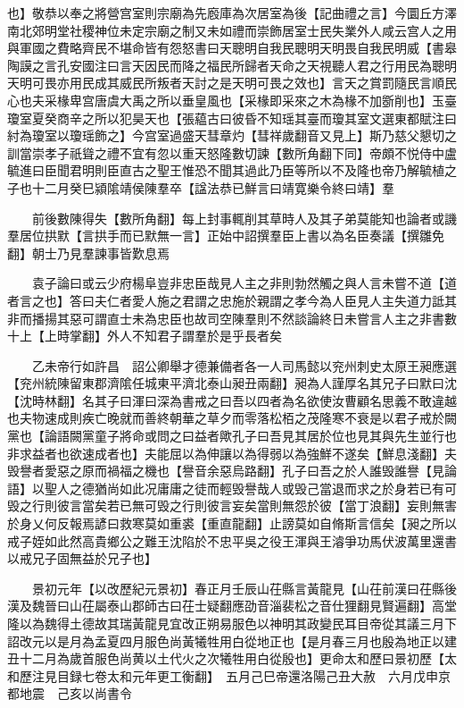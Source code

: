 也】敬恭以奉之將營宫室則宗廟為先廏庫為次居室為後【記曲禮之言】今圜丘方澤南北郊明堂社稷神位未定宗廟之制又未如禮而崇飾居室士民失業外人咸云宫人之用與軍國之費略齊民不堪命皆有怨怒書曰天聰明自我民聰明天明畏自我民明威【書皋陶謨之言孔安國注曰言天因民而降之福民所歸者天命之天視聽人君之行用民為聰明天明可畏亦用民成其威民所叛者天討之是天明可畏之效也】言天之賞罰隨民言順民心也夫采椽卑宫唐虞大禹之所以垂皇風也【采椽即采來之木為椽不加斵削也】玉臺瓊室夏癸商辛之所以犯昊天也【張藴古曰彼昏不知瑶其臺而瓊其室文選東都賦注曰紂為瓊室以瓊瑶飾之】今宫室過盛天彗章灼【彗祥歲翻音又見上】斯乃慈父懇切之訓當崇孝子祇聳之禮不宜有忽以重天怒隆數切諫【數所角翻下同】帝頗不悦侍中盧毓進曰臣聞君明則臣直古之聖王惟恐不聞其過此乃臣等所以不及隆也帝乃解毓植之子也十二月癸巳潁隂靖侯陳羣卒【諡法恭已鮮言曰靖寛樂令終曰靖】羣

　　前後數陳得失【數所角翻】每上封事輒削其草時人及其子弟莫能知也論者或譏羣居位拱默【言拱手而已默無一言】正始中詔撰羣臣上書以為名臣奏議【撰雛免翻】朝士乃見羣諫事皆歎息焉

　　袁子論曰或云少府楊阜豈非忠臣哉見人主之非則勃然觸之與人言未嘗不道【道者言之也】答曰夫仁者愛人施之君謂之忠施於親謂之孝今為人臣見人主失道力詆其非而播揚其惡可謂直士未為忠臣也故司空陳羣則不然談論終日未嘗言人主之非書數十上【上時掌翻】外人不知君子謂羣於是乎長者矣

　　乙未帝行如許昌　詔公卿舉才德兼備者各一人司馬懿以兖州刺史太原王昶應選【兖州統陳留東郡濟隂任城東平濟北泰山昶丑兩翻】昶為人謹厚名其兄子曰默曰沈【沈時林翻】名其子曰渾曰深為書戒之曰吾以四者為名欲使汝曹顧名思義不敢違越也夫物速成則疾亡晚就而善終朝華之草夕而零落松栢之茂隆寒不衰是以君子戒於闕黨也【論語闕黨童子將命或問之曰益者歟孔子曰吾見其居於位也見其與先生並行也非求益者也欲速成者也】夫能屈以為伸讓以為得弱以為強鮮不遂矣【鮮息淺翻】夫毁譽者愛惡之原而禍福之機也【譽音余惡烏路翻】孔子曰吾之於人誰毁誰譽【見論語】以聖人之德猶尚如此况庸庸之徒而輕毁譽哉人或毁己當退而求之於身若已有可毁之行則彼言當矣若已無可毁之行則彼言妄矣當則無怨於彼【當丁浪翻】妄則無害於身乂何反報焉諺曰救寒莫如重裘【重直龍翻】止謗莫如自脩斯言信矣【昶之所以戒子姪如此然高貴鄉公之難王沈陷於不忠平吳之役王渾與王濬爭功馬伏波萬里還書以戒兄子固無益於兄子也】

　　景初元年【以改歷紀元景初】春正月壬辰山茌縣言黃龍見【山茌前漢曰茌縣後漢及魏晉曰山茌屬泰山郡師古曰茌士疑翻應劭音淄裴松之音仕狸翻見賢遍翻】高堂隆以為魏得土德故其瑞黃龍見宜改正朔易服色以神明其政變民耳目帝從其議三月下詔改元以是月為孟夏四月服色尚黃犧牲用白從地正也【是月春三月也殷為地正以建丑十二月為歲首服色尚黄以土代火之次犧牲用白從殷也】更命太和歷曰景初歷【太和歷注見目録七卷太和元年更工衡翻】　五月己巳帝還洛陽己丑大赦　六月戊申京都地震　己亥以尚書令

